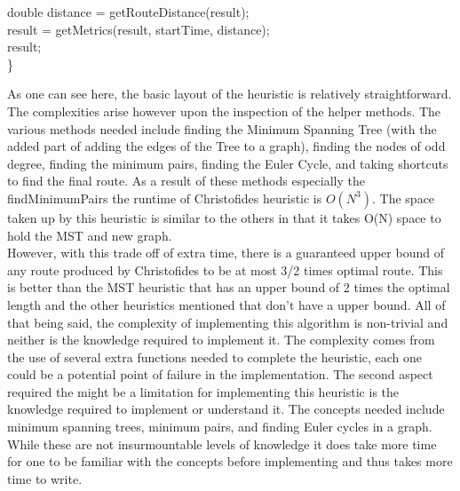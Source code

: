 \documentclass[midd]{thesis}
\newcommand{\tab}{\hspace*{2em}}
\begin{document}
\begin{codebox}
\tab double distance = getRouteDistance(result);\\
\tab result = getMetrics(result, startTime, distance);\\
\tab \Return result;\\
\}\\
\end{codebox}
\tab As one can see here, the basic layout of the heuristic is relatively straightforward. The complexities arise however upon the inspection of the helper methods. The various methods needed include finding the Minimum Spanning Tree (with the added part of adding the edges of the Tree to a graph), finding the nodes of odd degree, finding the minimum pairs, finding the Euler Cycle, and taking shortcuts to find the final route. As a result of these methods especially the findMinimumPairs the runtime of Christofides heuristic is $O(N^3)$. The space taken up by this heuristic is similar to the others in that it takes O(N) space to hold the MST and new graph. \\
\tab However, with this trade off of extra time, there is a guaranteed upper bound of any route produced by Christofides to be at most 3/2 times optimal route. This is better than the MST heuristic that has an upper bound of 2 times the optimal length and the other heuristics mentioned that don't have a upper bound. All of that being said, the complexity of implementing this algorithm is non-trivial and neither is the knowledge required to implement it. The complexity comes from the use of several extra functions needed to  complete the heuristic, each one could be a potential point of failure in the implementation. The second aspect required the might be a limitation for implementing this heuristic is the knowledge required to implement or understand it. The concepts needed include minimum spanning trees, minimum pairs, and finding Euler cycles in a graph. While these are not insurmountable levels of knowledge it does take more time for one to be familiar with the concepts before implementing and thus takes more time to write.
\end{document}
